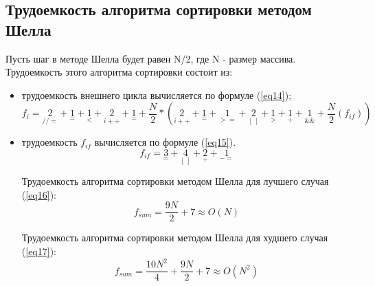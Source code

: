 \subsection{Трудоемкость алгоритма сортировки методом Шелла}
Пусть шаг в методе Шелла будет равен N/2, где N - размер массива. Трудоемкость этого алгоритма сортировки состоит из:
\begin{itemize}
	\item трудоемкость внешнего цикла вычисляется по формуле (\ref{eq14});
	\begin{equation}
		\label{eq14}
		f_{i} = {\underset{//=}{2}} + {\underset{=}{1}} + {\underset{<}{1}} +  
		{\underset{i++}{2}} + {\underset{=}{1}} +  \frac{N}{2} * ({\underset{i++}{2}} + {\underset{=}{1}} + {\underset{>=}{1}} + {\underset{[\ ]}{2}} + {\underset{>}{1}} + {\underset{+}{1}} + {\underset{\&\&}{1}} + \frac{N}{2} (f_{if}))
	\end{equation}
	\item трудоемкость $f_{if}$ вычисляется по формуле (\ref{eq15}).
	\begin{equation}
		\label{eq15}
		f_{if} = {\underset{=}{3}} + {\underset{[\ ]}{4}} + {\underset{+}{2}} + {\underset{-=}{1}}
	\end{equation}
	
	Трудоемкость алгоритма сортировки методом Шелла для лучшего случая (\ref{eq16}):
	\begin{equation}
		\label{eq16}
		f_{sum} = \frac{9N}{2} + 7 \approx O(N)
	\end{equation}
	
	Трудоемкость алгоритма сортировки методом Шелла для худшего случая (\ref{eq17}):
	\begin{equation}
		\label{eq17}
		f_{sum} = \frac{10N^2}{4} + \frac{9N}{2} + 7 \approx O(N^2)
	\end{equation}
\end{itemize}

